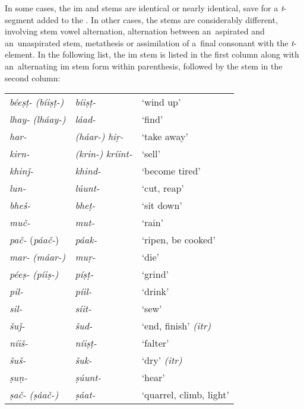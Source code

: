 In some cases, the im and  stems are identical or nearly identical, save for a \textit{t}-segment added to the . In other cases, the stems are considerably different, involving stem vowel alternation, alternation between an~aspirated and an~unaspirated stem, metathesis or assimilation of a~final consonant with the  \textit{t}-element. In the following list, the im stem is listed in the first column along with an~alternating im stem form within parenthesis, followed by the  stem in the second column:


\begin{table}[H]
\begin{tabularx}{\textwidth}{ l@{\hspace{40pt}} l@{\hspace{40pt}} Q }
\textit{béeṣṭ-} \textit{(bíiṣṭ-)} &
\textit{bíiṣṭ-}	&
`wind up' \\
\textit{lhay-} \textit{(lháay-)}	&
\textit{láad-}	&
`find' \\
\textit{har-} &
\textit{(háar-)}	\textit{hiṛ-}	&
`take away' \\
\textit{kirn-} &
\textit{(krin-)} \textit{kríint-}	&
`sell' \\
\textit{khinǰ-}&
\textit{khind-}	&
`become tired' \\
\textit{lun-} &
\textit{lúunt-}	&
`cut, reap' \\
\textit{bheš-} &
\textit{bheṭ-}	&
`sit down' \\
\textit{muč-} &
\textit{mut-}	&
`rain' \\
\textit{\textit{pač-}} (\textit{páač-})	&
\textit{páak-}	&
`ripen, be cooked' \\
\textit{mar-} \textit{(máar-)}&
\textit{muṛ-}	&
`die' \\
\textit{péeṣ-} \textit{(píiṣ-)} &
\textit{píṣṭ-}	&
`grind' \\
\textit{pil-} &\textit{píil-}	&
`drink' \\
\textit{sil-} &\textit{síit-}	&
`sew' \\
\textit{šuǰ-} &\textit{šud-}	&
`end, finish' \textit{(itr)}\\
\textit{níiš-} &\textit{níiṣṭ-}	&
`falter' \\
\textit{šuš-} &\textit{šuk-}	&
`dry'  \textit{(itr)} \\
\textit{ṣuṇ-} &\textit{ṣúunt-}	&
`hear' \\
\textit{ṣač-} \textit{(ṣáač-)} &	\textit{ṣáat-}	&
`quarrel, climb, light' \\
\end{tabularx}
\end{table}

